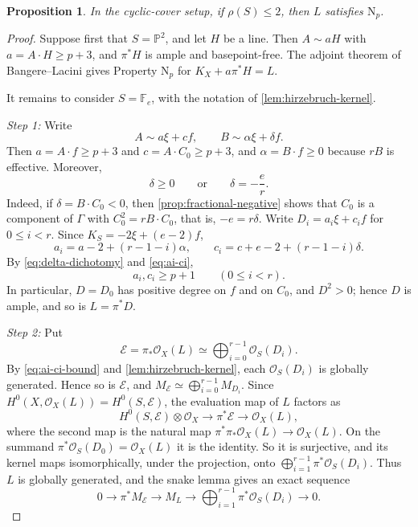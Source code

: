 \documentclass[11pt,reqno]{amsart}
\numberwithin{equation}{section}
\newtheorem{proposition}[proposition]{Proposition}
\theoremstyle{remark}
\newcommand{\sshf}[1]{\mathcal{O}_{#1}}
\newcommand{\shf}[1]{\mathscr{#1}}
\newcommand{\prj}[1]{\mathbb{P}^{#1}}
\newcommand{\NP}{\mathrm N}
\begin{document}
\begin{proposition}\label{prop:low-rank}
In the cyclic-cover setup, if \(\rho(S)\leq2\), then \(L\) satisfies
\(\NP_p\).
\end{proposition}

\begin{proof}
Suppose first that \(S=\prj{2}\), and let \(H\) be a line. Then \(A\sim aH\) with \(a=A\cdot H\geq p+3\), and \(\pi^*H\) is ample and basepoint-free. The adjoint theorem of Bangere--Lacini \cite[Theorem~1.2]{BangereLacini} gives Property \(\NP_p\) for \(K_X+a\pi^*H=L\).

It remains to consider \(S=\mathbb F_e\), with the notation of \cref{lem:hirzebruch-kernel}.

\smallskip\noindent\emph{Step 1: } Write
\[
 A\sim a\xi+cf,\qquad B\sim\alpha\xi+\delta f.
\]
Then \(a=A\cdot f\geq p+3\) and \(c=A\cdot C_0\geq p+3\), and \(\alpha=B\cdot f\geq0\) because \(rB\) is effective. Moreover,
\begin{equation}\label{eq:delta-dichotomy}
 \delta\geq0\qquad\text{or}\qquad\delta=-\frac er.
\end{equation}
Indeed, if \(\delta=B\cdot C_0<0\), then \cref{prop:fractional-negative} shows that \(C_0\) is a component of \(\Gamma\) with \(C_0^2=rB\cdot C_0\), that is, \(-e=r\delta\). Write \(D_i=a_i\xi+c_if\) for \(0\leq i<r\). Since \(K_S=-2\xi+(e-2)f\),
\begin{equation}\label{eq:ai-ci}
 a_i=a-2+(r-1-i)\alpha,\qquad
 c_i=c+e-2+(r-1-i)\delta.
\end{equation}
By \eqref{eq:delta-dichotomy} and \eqref{eq:ai-ci},
\begin{equation}\label{eq:ai-ci-bound}
 a_i,c_i\geq p+1\qquad(0\leq i<r).
\end{equation}
In particular, \(D=D_0\) has positive degree on \(f\) and on \(C_0\), and \(D^2>0\); hence \(D\) is ample, and so is \(L=\pi^*D\).

\smallskip\noindent\emph{Step 2:} Put
\[
 \shf{E}=\pi_*\sshf{X}(L)\simeq\bigoplus_{i=0}^{r-1}\sshf{S}(D_i).
\]
By \eqref{eq:ai-ci-bound} and \cref{lem:hirzebruch-kernel}, each \(\sshf{S}(D_i)\) is globally generated. Hence so is \(\shf{E}\), and \(M_{\shf{E}}\simeq\bigoplus_{i=0}^{r-1}M_{D_i}\). Since \(H^0(X,\sshf{X}(L))=H^0(S,\shf{E})\), the evaluation map of \(L\) factors as
\[
 H^0(S,\shf{E})\otimes\sshf{X}\longrightarrow\pi^*\shf{E}
 \longrightarrow\sshf{X}(L),
\]
where the second map is the natural map \(\pi^*\pi_*\sshf{X}(L)\to\sshf{X}(L)\). On the summand \(\pi^*\sshf{S}(D_0)=\sshf{X}(L)\) it is the identity. So it is surjective, and its kernel maps isomorphically, under the projection, onto \(\bigoplus_{i=1}^{r-1}\pi^*\sshf{S}(D_i)\). Thus \(L\) is globally generated, and the snake lemma gives an exact sequence
\begin{equation}\label{eq:cover-evaluation-Fe}
 0\longrightarrow\pi^*M_{\shf{E}}
 \longrightarrow M_L
 \longrightarrow
 \bigoplus_{i=1}^{r-1}\pi^*\sshf{S}(D_i)
 \longrightarrow0.
\end{equation}


\end{proof}
\end{document}

